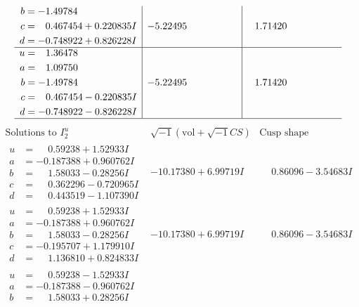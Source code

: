 \documentclass[1p]{elsarticle_modified}
\theoremstyle{definition}
\newcommand{\I}{\sqrt{-1}}
\begin{document}
$$\begin{array}{c|c|c}
\begin{aligned}
b &= -1.49784\phantom{ +0.000000I} \\
c &= \phantom{-}0.467454 + 0.220835 I \\
d &= -0.748922 + 0.826228 I\end{aligned}
 & -5.22495\phantom{ +0.000000I} & \phantom{-}1.71420\phantom{ +0.000000I} \\ \hline\begin{aligned}
u &= \phantom{-}1.36478\phantom{ +0.000000I} \\
a &= \phantom{-}1.09750\phantom{ +0.000000I} \\
b &= -1.49784\phantom{ +0.000000I} \\
c &= \phantom{-}0.467454 - 0.220835 I \\
d &= -0.748922 - 0.826228 I\end{aligned}
 & -5.22495\phantom{ +0.000000I} & \phantom{-}1.71420\phantom{ +0.000000I}\\
 \hline 
 \end{array}$$\newpage$$\begin{array}{c|c|c}  
\text{Solutions to }I^u_{2}& \I (\text{vol} + \sqrt{-1}CS) & \text{Cusp shape}\\
 \hline 
\begin{aligned}
u &= \phantom{-}0.59238 + 1.52933 I \\
a &= -0.187388 + 0.960762 I \\
b &= \phantom{-}1.58033 - 0.28256 I \\
c &= \phantom{-}0.362296 - 0.720965 I \\
d &= \phantom{-}0.443519 - 1.107390 I\end{aligned}
 & -10.17380 + 6.99719 I & \phantom{-}0.86096 - 3.54683 I \\ \hline\begin{aligned}
u &= \phantom{-}0.59238 + 1.52933 I \\
a &= -0.187388 + 0.960762 I \\
b &= \phantom{-}1.58033 - 0.28256 I \\
c &= -0.195707 + 1.179910 I \\
d &= \phantom{-}1.136810 + 0.824833 I\end{aligned}
 & -10.17380 + 6.99719 I & \phantom{-}0.86096 - 3.54683 I \\ \hline\begin{aligned}
u &= \phantom{-}0.59238 - 1.52933 I \\
a &= -0.187388 - 0.960762 I \\
b &= \phantom{-}1.58033 + 0.28256 I \\

\end{aligned}
\end{array}$$
\end{document}
